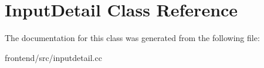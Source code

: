 \hypertarget{classInputDetail}{\section{Input\-Detail Class Reference}
\label{classInputDetail}
}


The documentation for this class was generated from the following file\-:\begin{DoxyCompactItemize}
\item 
frontend/src/inputdetail.\-cc\end{DoxyCompactItemize}
